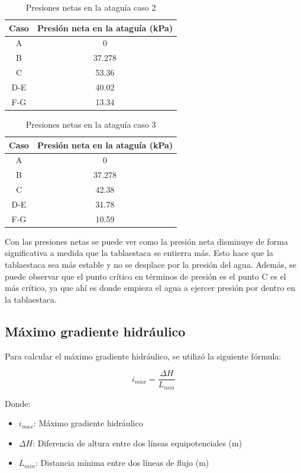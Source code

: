 \documentclass{article}
\begin{document}
\begin{table}[h!]
  \centering
  \begin{tabular}{cc}
    \hline
    \textbf{Caso} & \textbf{Presión neta en la ataguía (kPa)} \\
    \hline
    A & 0 \\
    B & 37.278 \\
    C & 53.36 \\
    D-E & 40.02\\
    F-G & 13.34 \\
    \hline  
  \end{tabular}
  \caption{Presiones netas en la ataguía caso 2}
  \label{tab:presion_neta2}
\end{table}

\begin{table}[h!]
  \centering
  \begin{tabular}{cc}
    \hline
    \textbf{Caso} & \textbf{Presión neta en la ataguía (kPa)} \\
    \hline
    A & 0 \\
    B & 37.278 \\
    C & 42.38 \\
    D-E & 31.78\\
    F-G & 10.59 \\
    \hline  
  \end{tabular}
  \caption{Presiones netas en la ataguía caso 3}
  \label{tab:presion_neta3}
\end{table}

Con las presiones netas se puede ver como la presión neta disminuye de forma significativa a medida que la tablaestaca se entierra más. Esto hace que la tablaestaca sea más estable y no se desplace por la presión del agua. Además, se puede observar que el punto crítico en términos de presión es el punto C es el más crítico, ya que ahí es donde empieza el agua a ejercer presión por dentro en la tablaestaca.


\subsection{Máximo gradiente hidráulico}

Para calcular el máximo gradiente hidráulico, se utilizó la siguiente fórmula:

\begin{equation}
  i_{max} = \frac{\Delta H}{L_{min}}
\end{equation}

Donde:
\begin{itemize}
    \item $i_{max}$: Máximo gradiente hidráulico 
    \item $\Delta H$: Diferencia de altura entre dos líneas equipotenciales (m)
    \item $L_{min}$: Distancia mínima entre dos líneas de flujo (m)
\end{itemize}
\end{document}
